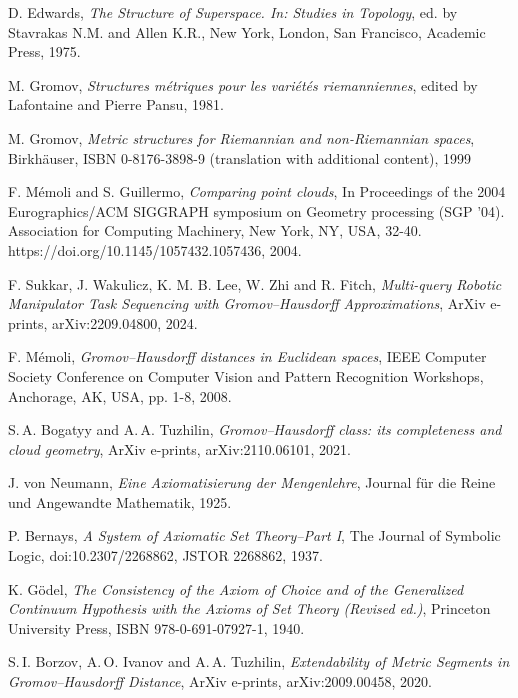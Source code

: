 \documentclass[leqno]{article}
\begin{document}
\begin{thebibliography}{99}
    
 D. Edwards, \emph{The Structure of Superspace. In: Studies in Topology}, ed. by Stavrakas N.M. and Allen K.R., New York, London, San Francisco, Academic Press, 1975.

 M. Gromov, \emph{Structures m\'etriques pour les vari\'et\'es riemanniennes}, edited by Lafontaine and Pierre Pansu, 1981.

 M. Gromov, \emph{Metric structures for Riemannian and non-Riemannian spaces}, Birkh\"auser, ISBN 0-8176-3898-9 (translation with additional content), 1999

F. M\'emoli and S. Guillermo, \emph{Comparing point clouds}, In Proceedings of the 2004 Eurographics/ACM SIGGRAPH symposium on Geometry processing (SGP '04). Association for Computing Machinery, New York, NY, USA, 32-40. https://doi.org/10.1145/1057432.1057436, 2004.

 F. Sukkar, J. Wakulicz, K. M. B. Lee, W. Zhi and R. Fitch, \emph{Multi-query Robotic Manipulator Task Sequencing with Gromov--Hausdorff Approximations}, ArXiv e-prints, arXiv:2209.04800, 2024.

F. M\'emoli, \emph{Gromov--Hausdorff distances in Euclidean spaces}, IEEE Computer Society Conference on Computer Vision and Pattern Recognition Workshops, Anchorage, AK, USA, pp. 1-8, 2008.

S.\,A. Bogatyy and A.\,A. Tuzhilin, \emph{Gromov--Hausdorff class: its completeness and cloud geometry}, ArXiv e-prints,
arXiv:2110.06101, 2021.

J. von Neumann, \emph{Eine Axiomatisierung der Mengenlehre}, Journal f\"ur die Reine und Angewandte Mathematik, 1925.

P. Bernays, \emph{A System of Axiomatic Set Theory--Part I}, The Journal of Symbolic Logic, doi:10.2307/2268862, JSTOR 2268862, 1937.

K. G\"odel, \emph{The Consistency of the Axiom of Choice and of the Generalized Continuum Hypothesis with the Axioms of Set Theory (Revised ed.)}, Princeton University Press,  ISBN 978-0-691-07927-1, 1940.

S.\,I. Borzov, A.\,O. Ivanov and A.\,A. Tuzhilin, \emph{Extendability of Metric Segments in Gromov--Hausdorff Distance}, ArXiv e-prints, arXiv:2009.00458, 2020.


\end{thebibliography}
\end{document}
